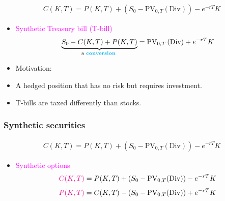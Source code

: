 \begin{frame}[fragile,t]
	\begin{align*}
		C(K,T) = P(K,T) + \left(S_0-\text{PV}_{0,T}(\text{Div})\right) - e^{-rT} K
	\end{align*}
	\mySeparateLine

	\begin{itemize}
		\item \textcolor{magenta}{Synthetic Treasury bill (T-bill)}
			\begin{align*}
				\underbrace{S_0 - C(K,T) + P(K,T)}_{\text{a \textcolor{cyan}{\bf conversion} }} = \text{PV}_{0,T}\left(\text{Div}\right) + e^{-rT} K
			\end{align*}
			\bigskip
			\bigskip

		\item[] Motivation:
		\item[] A hedged position that has no risk but requires investment.
		\item[]  T-bills are taxed differently than stocks.
	\end{itemize}
\end{frame}
\begin{frame}[fragile,t]
	\frametitle{Synthetic securities}
	\begin{align*}
		C(K,T) = P(K,T) + \left(S_0-\text{PV}_{0,T}(\text{Div})\right) - e^{-rT} K
	\end{align*}
	\mySeparateLine

	\begin{itemize}
		\item \textcolor{magenta}{Synthetic options}
			\bigskip
			\begin{align*}
				\textcolor{magenta}{C(K,T)} = P(K,T) + \left(S_0-\text{PV}_{0,T}(\text{Div})\right) - e^{-rT} K
			\end{align*}
			\begin{align*}
				\textcolor{magenta}{P(K,T)} = C(K,T) - \left(S_0-\text{PV}_{0,T}(\text{Div})\right) + e^{-rT} K
			\end{align*}
	\end{itemize}
\end{frame}
